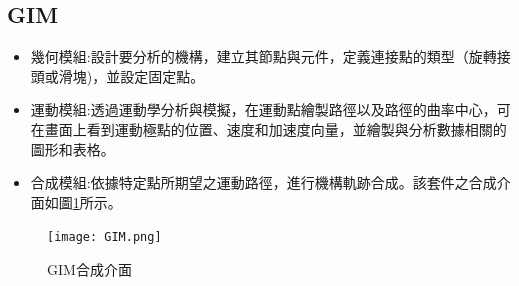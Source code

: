 \documentclass[14pt,a4paper]{report}  %
\newcommand{\fourteen}{\fontsize{14pt}{\baselineskip}\selectfont}%
\begin{document}
		\subsection{GIM}     
		\fourteen {GIM是COMPMECH Research Group創建的註冊免費軟件，用於平面機構的運動模擬合成以及機械結構的靜態分析。GIM軟件具有三個主要模組：幾何、運動、合成。}
        \begin{itemize} 
       	\item 幾何模組:設計要分析的機構，建立其節點與元件，定義連接點的類型（旋轉接頭或滑塊)，並設定固定點。
       	\item 運動模組:透過運動學分析與模擬，在運動點繪製路徑以及路徑的曲率中心，可在畫面上看到運動極點的位置、速度和加速度向量，並繪製與分析數據相關的圖形和表格。
       	\item 合成模組:依據特定點所期望之運動路徑，進行機構軌跡合成。該套件之合成介面如圖\ref{fig_GIM:scale}所示。
       	\end{itemize}
       
        \begin{figure}[H]
        \centering
        \texttt{[image: GIM.png]} 
        \caption{GIM合成介面} 
        \label{fig_GIM:scale}
    	\end{figure}
\newpage

\end{document}
